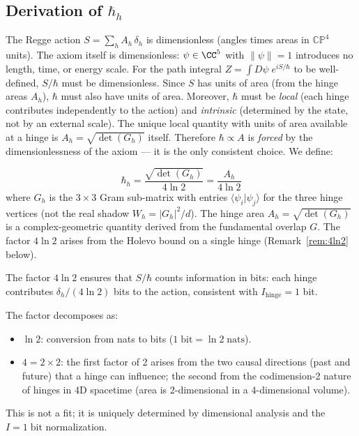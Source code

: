 \subsection{Derivation of $\hbar_h$}

The Regge action $S = \sum_h A_h\,\delta_h$ is dimensionless (angles times areas in $\mathbb{CP}^4$ units). The axiom itself is dimensionless: $\psi \in \CC^5$ with $\|\psi\| = 1$ introduces no length, time, or energy scale. For the path integral $Z = \int D\psi\; e^{iS/\hbar}$ to be well-defined, $S/\hbar$ must be dimensionless. Since $S$ has units of area (from the hinge areas $A_h$), $\hbar$ must also have units of area. Moreover, $\hbar$ must be \emph{local} (each hinge contributes independently to the action) and \emph{intrinsic} (determined by the state, not by an external scale). The unique local quantity with units of area available at a hinge is $A_h = \sqrt{\det(G_h)}$ itself. Therefore $\hbar \propto A$ is \emph{forced} by the dimensionlessness of the axiom --- it is the only consistent choice. We define:

\begin{equation}
\boxed{\hbar_h = \frac{\sqrt{\det(G_h)}}{4\ln 2} = \frac{A_h}{4\ln 2}}
\label{eq:hbar}
\end{equation}
where $G_h$ is the $3 \times 3$ Gram sub-matrix with entries $\langle\psi_i|\psi_j\rangle$ for the three hinge vertices (not the real shadow $W_h = |G_h|^2/d$). The hinge area $A_h = \sqrt{\det(G_h)}$ is a complex-geometric quantity derived from the fundamental overlap $G$. The factor $4\ln 2$ arises from the Holevo bound on a single hinge (Remark~\ref{rem:4ln2} below).

The factor $4\ln 2$ ensures that $S/\hbar$ counts information in bits: each hinge contributes $\delta_h/(4\ln 2)$ bits to the action, consistent with $I_\text{hinge} = 1$ bit.

\begin{remark}
\label{rem:4ln2}
The factor decomposes as:
\begin{itemize}
\item $\ln 2$: conversion from nats to bits ($1\;\text{bit} = \ln 2\;\text{nats}$).
\item $4 = 2 \times 2$: the first factor of 2 arises from the two causal directions (past and future) that a hinge can influence; the second from the codimension-2 nature of hinges in 4D spacetime (area is 2-dimensional in a 4-dimensional volume).
\end{itemize}
This is not a fit; it is uniquely determined by dimensional analysis and the $I = 1\;\text{bit}$ normalization.
\end{remark}

